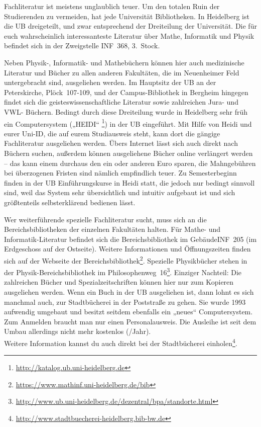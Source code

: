 Fachliteratur ist meistens unglaublich teuer. Um den totalen Ruin  der Studierenden zu vermeiden,
hat jede Universität Bibliotheken.  In Heidelberg ist die \gls{UB} dreigeteilt, und zwar
entsprechend  der Dreiteilung der Universität. Die für euch wahrscheinlich  interessanteste
Literatur über Mathe, Informatik und Physik befindet sich in  der Zweigstelle \gls{INF}~368, 3.~Stock.

Neben Physik-, Informatik-  und Mathebüchern können hier auch medizinische Literatur und Bücher zu allen anderen
Fakultäten, die im Neuenheimer Feld untergebracht sind, ausgeliehen werden. Im Hauptsitz der
\gls{UB} an der Peterskirche, Plöck~107-109, und der Campus-Bibliothek in Bergheim hingegen findet
sich die geisteswissenschaftliche Literatur sowie zahlreichen Jura- und VWL- Büchern. Bedingt durch
diese Dreiteilung wurde in Heidelberg sehr früh ein Computersystem („\gls{HEIDI}“
\footnote{\url{http://katalog.ub.uni-heidelberg.de}}) in der UB eingeführt. Mit Hilfe von Heidi und
eurer Uni-ID, die auf eurem Studiausweis steht, kann dort die gängige Fachliteratur ausgeliehen werden.
Übers Internet lässt sich auch direkt nach Büchern suchen, außerdem können ausgeliehene Bücher
online verlängert werden -- das kann einem durchaus den ein oder anderen Euro sparen, die
Mahngebühren bei überzogenen Fristen sind nämlich empfindlich teuer. Zu Semesterbeginn finden in der
UB Einführungskurse in Heidi statt, die jedoch nur bedingt sinnvoll sind, weil das System sehr
übersichtlich und intuitiv aufgebaut ist und sich größtenteils selbsterklärend bedienen lässt.

Wer weiterführende spezielle Fachliteratur sucht, muss sich an die Bereichsbibliotheken der
einzelnen Fakultäten halten. Für Mathe- und Informatik-Literatur befindet sich die Bereichsbibliothek
im Gebäude\-\gls{INF}~205 (im Erdgeschoss auf der Ostseite). Weitere Informationen und Öffnungszeiten
finden sich auf der Webseite der Bereichsbibliothek\footnote{\url{https://www.mathinf.uni-heidelberg.de/bib}}.
Spezielle Physikbücher stehen in der Physik-Bereichsbibliothek im
Philosophenweg~16\footnote{\url{http://www.ub.uni-heidelberg.de/dezentral/bpa/standorte.html}}. Einziger
Nachteil: Die zahlreichen Bücher und Spezialzeitschriften können hier nur zum Kopieren ausgeliehen
werden. Wenn ein Buch in der UB ausgeliehen ist, dann lohnt es sich manchmal auch, zur Stadtbücherei
in der Poststraße zu gehen. Sie wurde 1993 aufwendig umgebaut und besitzt seitdem ebenfalls ein
„neues“ Computersystem. Zum Anmelden braucht man nur einen Personalausweis. Die Ausleihe ist seit dem
Umbau allerdings nicht mehr kostenlos (/Jahr).\\
Weitere Information kannst du auch direkt bei der Stadtbücherei einholen\footnote{\url{http://www.stadtbuecherei-heidelberg.bib-bw.de}}.

